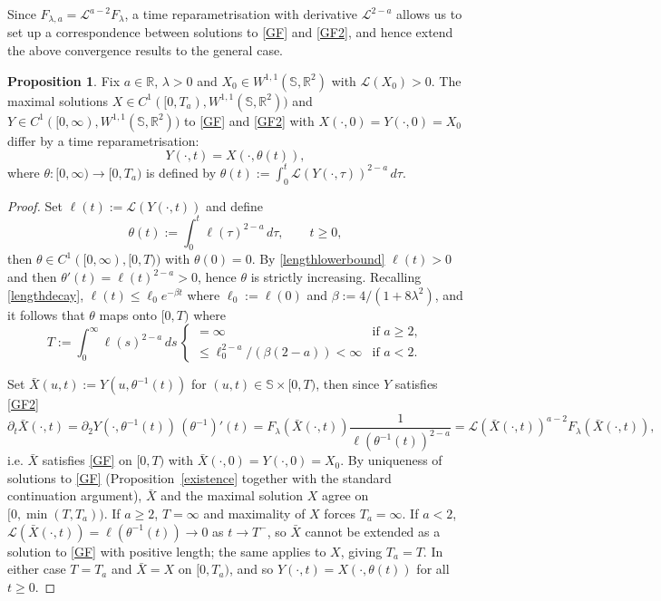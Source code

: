 \documentclass[a4paper,11pt]{amsart}
\theoremstyle{definition}\newtheorem*{definition}{Definition}
\theoremstyle{definition} \newtheorem{proposition}[theorem]{Proposition}
\theoremstyle{definition}\newtheorem{lemma}[theorem]{Lemma}
\theoremstyle{definition}\newtheorem{corollary}[theorem]{Corollary}
\theoremstyle{definition}\newtheorem{example}{Example}
\theoremstyle{remark}\newtheorem*{remark}{Remark}
\def\R{\mathbb{R}}
\def\S{\mathbb{S}}
\def\length{\mathcal L}
\def\wsr{W^{1,1}(\S,\R^2)}
\begin{document}
Since $F_{\lambda,a}=\length^{a-2}F_\lambda$, a time reparametrisation with derivative $\length^{2-a}$  allows us to set up a correspondence between solutions to \eqref{GF} and \eqref{GF2}, and hence extend the above convergence results to the general case. 

\begin{proposition}\label{timescaling}
Fix $a\in\R$, $\lambda>0$ and $X_0\in W^{1,1}(\S,\R^2)$ with $\length(X_0)>0$. The maximal solutions $X\in C^1([0,T_a),\wsr)$ and $Y\in C^1([0,\infty),\wsr)$ to \eqref{GF} and \eqref{GF2} with $X(\cdot,0)=Y(\cdot,0)=X_0$ differ by a time reparametrisation:
\[
Y(\cdot,t)=X(\cdot,\theta(t)),
\]
where $\theta:[0,\infty)\to[0,T_a)$ is defined by $\theta(t):=\int_0^t \length(Y(\cdot, \tau))^{2-a}\,d\tau$.
\end{proposition}
\begin{proof}
Set $\ell(t):=\length(Y(\cdot,t))$
and define
\[
\theta(t):=\int_0^t \ell(\tau)^{2-a}\,d\tau,\qquad t\geq 0,
\]
then $\theta\in C^1([0,\infty),[0,T))$ with $\theta(0)=0$. By \eqref{lengthlowerbound} $\ell(t)>0$ and then $\theta'(t)=\ell(t)^{2-a}>0$, hence $\theta$ is strictly increasing. Recalling \eqref{lengthdecay}, 
$\ell(t)\leq \ell_0e^{-\beta t}$ where $ \ell_0:=\ell(0)$ and $ \beta:=4/(1+8\lambda^2)$, and it follows that $\theta$ maps onto $[0,T)$ where 
\[
T:=\int_0^\infty \ell(s)^{2-a}\,ds \,
\begin{cases}
=\infty & \text{if } a\geq 2,\\
\leq \ell_0^{2-a}/(\beta(2-a))<\infty & \text{if }a<2.
\end{cases}
\]

Set $\bar X(u,t):=Y(u,\theta^{-1}(t))$ for $(u,t)\in\S\times[0,T)$, then since $Y$ satisfies \eqref{GF2}
\[
\partial_t \bar X(\cdot,t)
=\partial_2 Y(\cdot,\theta^{-1}(t))\,(\theta^{-1})'(t)
=F_\lambda(\bar X(\cdot,t))\frac{1}{\ell(\theta^{-1}(t))^{2-a}}
=\length(\bar X(\cdot,t))^{a-2}F_\lambda(\bar X(\cdot,t)),
\]
i.e. $\bar X$ satisfies \eqref{GF} on $[0,T)$ with $\bar X(\cdot,0)=Y(\cdot,0)=X_0$. By uniqueness of solutions to \eqref{GF} (Proposition~\ref{existence} together with the standard continuation argument), $\bar X$ and the maximal solution $X$ agree on $[0,\min(T,T_a))$. If $a\geq 2$, $T=\infty$ and maximality of $X$ forces $T_a=\infty$. If $a<2$, $\length(\bar X(\cdot,t))=\ell(\theta^{-1}(t))\to 0$ as $t\to T^-$, so $\bar X$ cannot be extended as a solution to \eqref{GF} with positive length; the same applies to $X$, giving $T_a=T$. In either case $T=T_a$ and $\bar X=X$ on $[0,T_a)$, and so 
$Y(\cdot,t)=X(\cdot,\theta(t))$ for all $t\geq 0.$
\end{proof}
\end{document}
